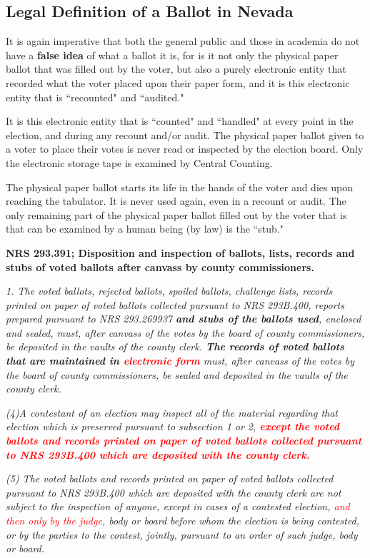 \documentclass[preprint,13pt]{elsarticle}
\begin{document}
\subsection{Legal Definition of a Ballot in Nevada}
It is again imperative that both the general public and those in academia do not have a \textbf{false idea} of what a ballot it is, for is it not only the physical paper ballot that was filled out by the voter, but also a purely electronic entity that recorded what the voter placed upon their paper form, and it is this electronic entity that is ``recounted" and ``audited." 

It is this electronic entity that is ``counted" and ``handled" at every point in the election, and during any recount and/or audit. The physical paper ballot given to a voter to place their votes is never read or inspected by the election board. Only the electronic storage tape is examined by Central Counting.

The physical paper ballot starts its life in the hands of the voter and dies upon reaching the tabulator. It is never used again, even in a recount or audit. The only remaining part of the physical paper ballot filled out by the voter that is that can be examined by a human being (by law) is the ``stub."

\textbf{NRS 293.391; Disposition and inspection of ballots, lists, records and \textbf{stubs} of voted ballots after canvass by county commissioners.}

\textit{1. The voted ballots, rejected ballots, spoiled ballots, challenge lists, records printed on paper of voted ballots collected pursuant to NRS 293B.400, reports prepared pursuant to NRS 293.269937 \textbf{and stubs of the ballots used}, enclosed and sealed, must, after canvass of the votes by the board of county commissioners, be deposited in the vaults of the county clerk. \textbf{The records of voted ballots that are maintained in \textcolor{red}{electronic form}} must, after canvass of the votes by the board of county commissioners, be sealed and deposited in the vaults of the county clerk.}

\textit{(4)A contestant of an election may inspect all of the material regarding that election which is preserved pursuant to subsection 1 or 2, \textbf{\textcolor{red}{except the voted ballots and records printed on paper of voted ballots collected pursuant to NRS 293B.400 which are deposited with the county clerk.}}}

\textit{(5) The voted ballots and records printed on paper of voted ballots collected pursuant to NRS 293B.400 which are deposited with the county clerk are not subject to the inspection of anyone, except in cases of a contested election, \textcolor{red}{and then only by the judge}, body or board before whom the election is being contested, or by the parties to the contest, jointly, pursuant to an order of such judge, body or board.}
\end{document}
